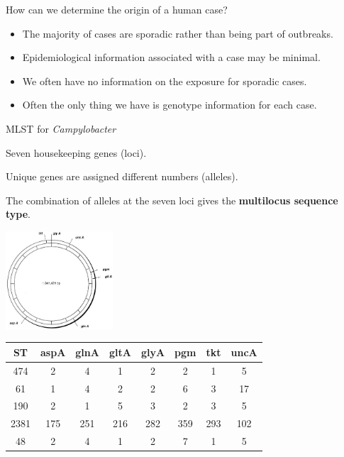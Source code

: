 \documentclass[]{beamer}
\begin{document}
\begin{frame}{How can we determine the origin of a human case?}
\begin{itemize}
\item The majority of cases are sporadic rather than being part of outbreaks.
\gap
\item Epidemiological information associated with a case may be minimal.
\gap
\item We often have no information on the exposure for sporadic cases.
\gap
\item Often the only thing we have is genotype information for each case.
\end{itemize}
\end{frame}

\begin{frame}{MLST for \emph{Campylobacter}}
\begin{minipage}{0.7\linewidth}
Seven housekeeping genes (loci).

\gap
Unique genes are assigned different numbers (alleles).

\gap
The combination of alleles at the seven loci gives the \textbf{multilocus sequence type}.
\end{minipage}
\begin{minipage}{0.25\linewidth}
\includegraphics[width=4cm]{Pictures/campy_genome.jpg}
\end{minipage}
\begin{center}
\begin{tabular}{cccccccc}
ST & aspA & glnA & gltA & glyA & pgm & tkt & uncA\\
\hline
474 & 2 & 4 & 1 & 2 & 2 & 1 & 5\\
61 & 1 &      4 &      2 &      2 &      6 &       3     &  17\\
190   &  2    &   1     &  5   &    3   &    2    &   3    &   5\\
2381  &  175   &  251   &  216   &  282 &    359  &   293 &  102\\
48 & 2 & 4 & 1 & 2 & 7 & 1 & 5
\end{tabular}
\end{center}
\end{frame}
\end{document}
